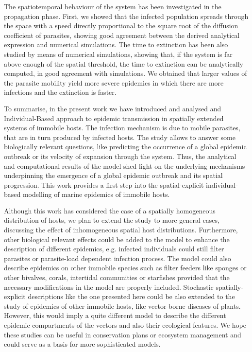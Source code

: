 The spatiotemporal behaviour of the system has been investigated in the
propagation phase. First, we showed that the infected population spreads
through the space with a speed directly proportional to the square root of the
diffusion coefficient of parasites, showing good agreement between the derived
analytical expression and numerical simulations. The time to extinction has
been also studied by means of numerical simulations, showing that, if the
system is far above enough of the spatial threshold, the time to extinction can
be analytically computed, in good agreement with simulations. We obtained that
larger values of the parasite mobility yield more severe epidemics in which
there are more infections and the extinction is faster.

To summarise, in the present work we have introduced and analysed and
Individual-Based approach to epidemic transmission in spatially extended
systems of immobile hosts. The infection mechanism is due to mobile parasites,
that are in turn produced by infected hosts. The study allows to answer some
biologically relevant questions, like predicting the occurrence of a global
epidemic outbreak or its velocity of expansion through the system. Thus, the
analytical and computational results of the model shed light on the underlying
mechanisms underpinning the emergence of a global epidemic outbreak and its
spatial progression. This work provides a first step into the spatial-explicit
individual-based modelling of marine epidemics of immobile hosts.

Although this work has considered the case of a spatially homogeneous
distribution of hosts, we plan to extend the study to more general cases,
discussing the effect of inhomogeneous spatial host distributions. Furthermore,
other biological relevant effects could be added to the model to enhance the
description of different epidemics, e.g. infected individuals could still
filter parasites or parasite-load dependent infection process. The model could
also describe epidemics on other immobile species such as filter feeders like
sponges or other bivalves, corals, intertidal communities or starfishes
provided that the necessary modifications in the model are properly included.
Stochastic spatially-explicit descriptions like the one presented here could be
also extended to the study of epidemics of other immobile hosts, like
vector-borne diseases of plants. However, this would imply a quite different
model to describe the different epidemic compartments of the vectors and also
their ecological features. We hope these studies can be useful in conservation
plans or ecosystem management and could serve as a basis for more sophisticated
models.

